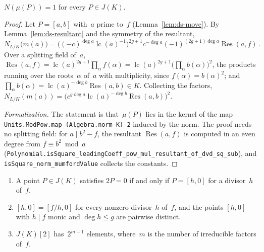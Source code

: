 \begin{theorem}
\label{thm:ds-norm}
\leanok
{}
$N(\mu(P)) = 1$ for every $P \in J(K)$.
\end{theorem}

\begin{proof}
\leanok
{}
Let $P = [a, b]$ with~$a$ prime to~$f$ (Lemma~\ref{lem:ds-move}). By
Lemma~\ref{lem:ds-resultant} and the symmetry of the resultant,
\[ N_{L/K}\bigl(m(a)\bigr) = \bigl((-c)^{\deg a}\operatorname{lc}(a)^{-1}\bigr)^{2g+1}
   c^{-\deg a}(-1)^{(2g+1)\deg a}\operatorname{Res}(a, f)\,. \]
Over a splitting field of~$a$, $\operatorname{Res}(a, f) =
\operatorname{lc}(a)^{2g+1}\prod_\alpha f(\alpha) = \operatorname{lc}(a)^{2g+1}\bigl(\prod_\alpha
b(\alpha)\bigr)^2$, the products running over the roots~$\alpha$ of~$a$ with multiplicity, since
$f(\alpha) = b(\alpha)^2$; and $\prod_\alpha b(\alpha) = \operatorname{lc}(a)^{-\deg
b}\operatorname{Res}(a, b) \in K$. Collecting the factors, $N_{L/K}(m(a)) = \bigl(c^{g\deg
a}\operatorname{lc}(a)^{-\deg b}\operatorname{Res}(a, b)\bigr)^2$.

\emph{Formalization.} The statement is that~$\mu(P)$ lies in the kernel of the map
\texttt{Units.ModPow.map (Algebra.norm K) 2} induced by the norm. The proof needs no splitting
field: for $a \mid b^2 - f$, the resultant $\operatorname{Res}(a, f)$ is computed in an even
degree from $f \equiv b^2 \bmod a$
(\texttt{Polynomial.isSquare\_leadingCoeff\_pow\_mul\_resultant\_of\_dvd\_sq\_sub}), and
\texttt{isSquare\_norm\_mumfordValue} collects the constants.
\end{proof}

\begin{theorem}[$2$-torsion]
\label{thm:ds-two-torsion}
\leanok
{}
\begin{enumerate}
  \item A point $P \in J(K)$ satisfies $2P = 0$ if and only if $P = [h, 0]$ for a divisor~$h$
    of~$f$.
  \item $[h, 0] = [f/h, 0]$ for every nonzero divisor~$h$ of~$f$, and the points $[h, 0]$ with
    $h \mid f$ monic and $\deg h \le g$ are pairwise distinct.
  \item $J(K)[2]$ has~$2^{m-1}$ elements, where~$m$ is the number of irreducible factors of~$f$.
\end{enumerate}
\end{theorem}


